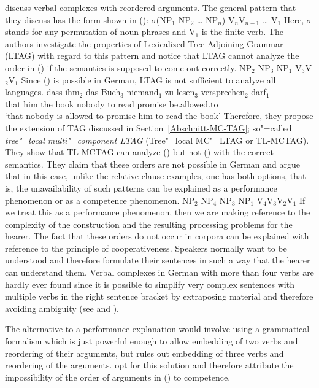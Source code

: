 \citet{JBR2000a} discuss verbal complexes with reordered arguments. The general pattern that they
discuss has the form shown in ():
\ea
$\sigma$(NP$_1$ NP$_2$ \ldots{} NP$_n$) V$_{n}$V$_{n-1}$ \ldots{} V$_{1}$
\z
Here, $\sigma$ stands for any permutation of noun phrases and V$_{1}$ is the finite verb.
The authors investigate the properties of Lexicalized Tree Adjoining Grammar (LTAG) with regard to this
pattern and notice that LTAG cannot analyze the order in () if the semantics is supposed to
come out correctly.
\ea
NP$_2$ NP$_3$ NP$_1$ V$_{3}$V$_{2}$V$_{1}$
\z
Since () is possible in German, LTAG is not sufficient to analyze all languages.
\ea
\gll dass ihm$_2$ das Buch$_3$ niemand$_1$ zu lesen$_3$ versprechen$_2$ darf$_1$\\
     that him     the book     nobody     to read      promise         be.allowed.to\\
\glt `that nobody is allowed to promise him to read the book' 
\z
Therefore, they propose the extension of TAG discussed in Section~\ref{Abschnitt-MC-TAG}; so"=called
\emph{tree"=local multi"=component LTAG} (Tree"=local MC"=LTAG or TL-MCTAG).
They show that TL-MCTAG can analyze () but not () with the correct semantics. They claim that these orders are not possible in German
and argue that in this case, unlike the relative clause examples, one has both options, that is, the
unavailability of such patterns can be explained as a performance phenomenon or as a
competence phenomenon.
\ea
\label{ex-mc-ltag-fails}
NP$_2$ NP$_4$ NP$_3$ NP$_1$ V$_{4}$V$_{3}$V$_{2}$V$_{1}$
\z
If we treat this as a performance phenomenon, then we are making reference to the complexity of the construction and the resulting processing problems
for the hearer. The fact that these orders do not occur in corpora can be explained with reference to the principle of cooperativeness.
Speakers normally want to be understood and therefore formulate their sentences in such a way that the hearer can understand them.
Verbal complexes in German with more than four verbs are hardly ever found since it is possible to simplify very complex sentences with multiple verbs in the 
right sentence bracket by extraposing material and therefore avoiding ambiguity (see \citealp[]{Netter91} and
\citealp[]{MuellerLehrbuch1}).

The alternative to a performance explanation would involve using a grammatical formalism which is
just powerful enough to allow embedding of two verbs and reordering of their arguments, but rules
out embedding of three verbs and reordering of the arguments. \citet{JBR2000a} opt for this solution
and therefore attribute the impossibility of the order of arguments in () to competence. 

